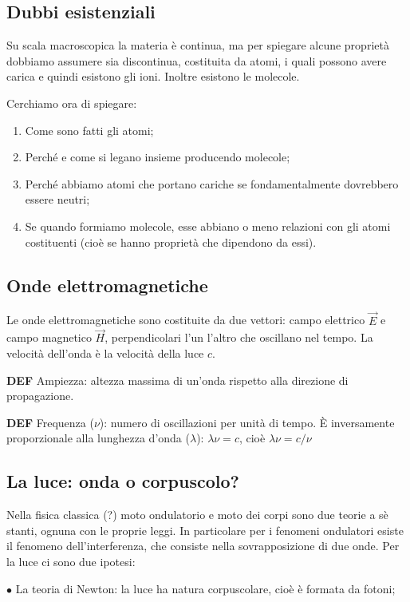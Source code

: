 \subsection{Dubbi esistenziali}
Su scala macroscopica la materia è continua, ma per spiegare alcune proprietà dobbiamo assumere sia discontinua, costituita da atomi, i quali possono avere carica e quindi esistono gli ioni. Inoltre esistono le molecole.

Cerchiamo ora di spiegare:
\begin{enumerate}
    \item Come sono fatti gli atomi;
    \item Perché e come si legano insieme producendo molecole;
    \item Perché abbiamo atomi che portano cariche se fondamentalmente dovrebbero essere neutri;
    \item Se quando formiamo molecole, esse abbiano o meno relazioni con gli atomi costituenti (cioè se hanno proprietà che dipendono da essi).
  \end{enumerate}
  
  \subsection{Onde elettromagnetiche}
Le onde elettromagnetiche sono costituite da due vettori: campo elettrico $\vec{E}$ e campo magnetico $\vec{H}$, perpendicolari l'un l'altro che oscillano nel tempo. La velocità dell'onda è la velocità della luce $c$.

\textbf{DEF} Ampiezza: altezza massima di un'onda rispetto alla direzione di propagazione. 

\textbf{DEF} Frequenza ($\nu$): numero di oscillazioni per unità di tempo. È inversamente proporzionale alla lunghezza d'onda ($\lambda$): $\lambda\nu=c$, cioè $\lambda\nu=c/\nu$

\subsection{La luce: onda o corpuscolo?}
Nella fisica classica (?) moto ondulatorio e moto dei corpi sono due teorie a sè stanti, ognuna con le proprie leggi.
In particolare per i fenomeni ondulatori esiste il fenomeno dell'interferenza, che consiste nella sovrapposizione di due onde.
Per la luce ci sono due ipotesi:

$\bullet$ La teoria di Newton: la luce ha natura corpuscolare, cioè è formata da fotoni;

